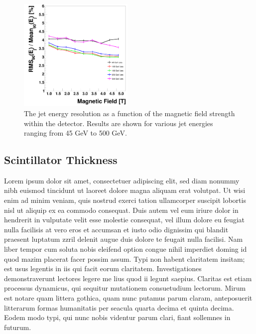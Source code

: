 \documentclass[final,3p,times,twocolumn]{elsarticle}
\begin{document}
\begin{figure}[!h]
  \begin{center}
     \includegraphics[width=0.49\textwidth]{JERvsBFieldHCalTC10ns.png}
     \caption{The jet energy resolution as a function of the magnetic field strength within the detector.  Results are shown for various jet energies ranging from 45 GeV to 500 GeV.\label{}}
  \end{center}
\end{figure}

\subsection{Scintillator Thickness}
Lorem ipsum dolor sit amet, consectetuer adipiscing elit, sed diam nonummy nibh euismod tincidunt ut laoreet dolore magna aliquam erat volutpat. Ut wisi enim ad minim veniam, quis
nostrud exerci tation ullamcorper suscipit lobortis nisl ut aliquip ex ea commodo consequat. Duis autem vel eum iriure dolor in hendrerit in vulputate velit esse molestie consequat,
vel illum dolore eu feugiat nulla facilisis at vero eros et accumsan et iusto odio dignissim qui blandit praesent luptatum zzril delenit augue duis dolore te feugait nulla facilisi.
Nam liber tempor cum soluta nobis eleifend option congue nihil imperdiet doming id quod mazim placerat facer possim assum. Typi non habent claritatem insitam; est usus legentis in
iis qui facit eorum claritatem. Investigationes demonstraverunt lectores legere me lius quod ii legunt saepius. Claritas est etiam processus dynamicus, qui sequitur mutationem
consuetudium lectorum. Mirum est notare quam littera gothica, quam nunc putamus parum claram, anteposuerit litterarum formas humanitatis per seacula quarta decima et quinta
decima. Eodem modo typi, qui nunc nobis videntur parum clari, fiant sollemnes in futurum.

\end{document}

